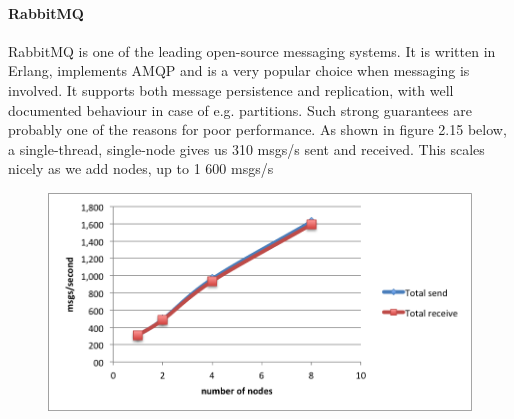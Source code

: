\paragraph{RabbitMQ}
\label{sec:sec01}
RabbitMQ is one of the leading open-source messaging systems. 
It is written in Erlang, implements AMQP and is a very popular choice when messaging is involved. 
It supports both message persistence and replication, with well documented behaviour in case of e.g. partitions.
Such strong guarantees are probably one of the reasons for poor performance. As shown in figure 2.15 below, 
a single-thread, single-node gives us 310 msgs/s sent and received. This scales nicely as we add nodes, up to 1 600 msgs/s

 \begin{figure}[h!]
	\centering
	\includegraphics[height=0.3\textheight]{fig01/RabbitMQ}
	\label{fig:FilialesEtClients}
\end{figure}


